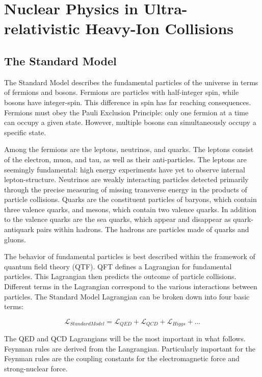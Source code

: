 
\chapter{Nuclear Physics in Ultra-relativistic Heavy-Ion Collisions}

\section{The Standard Model}

The Standard Model describes the fundamental particles of the universe in terms of fermions and bosons. Fermions are particles with half-integer spin, while bosons have integer-spin. This difference in spin has far reaching consequences. Fermions must obey the Pauli Exclusion Principle: only one fermion at a time can occupy a given state. However, multiple bosons can simultaneously occupy a specific state.

Among the fermions are the leptons, neutrinos, and quarks. The leptons consist of the electron, muon, and tau, as well as their anti-particles. The leptons are seemingly fundamental: high energy experiments have yet to observe internal lepton-structure. Neutrinos are weakly interacting particles detected primarily through the precise measuring of missing transverse energy in the products of particle collisions. Quarks are the constituent particles of baryons, which contain three valence quarks, and mesons, which contain two valence quarks. In addition to the valence quarks are the sea quarks, which appear and disappear as quark-antiquark pairs within hadrons. The hadrons are particles made of quarks and gluons.

The behavior of fundamental particles is best described within the framework of quantum field theory (QTF). QFT defines a Lagrangian for fundamental particles. This Lagrangian then predicts the outcome of particle collisions. Different terms in the Lagrangian correspond to the various interactions between particles. The Standard Model Lagrangian can be broken down into four basic terms:

\begin{equation}
\mathcal{L}_{Standard Model} = \mathcal{L}_{QED} + \mathcal{L}_{QCD} + \mathcal{L}_{Higgs} + ... 
\end{equation}

The QED and QCD Lagrangians will be the most important in what follows. Feynman rules are derived from the Langrangian. Particularly important for the Feynman rules are the coupling constants for the electromagnetic force and strong-nuclear force.

